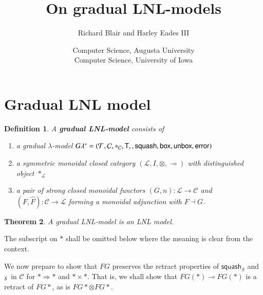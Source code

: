 \documentclass{article}
\date{}
\newtheorem{theorem}{Theorem}
\newtheorem{definition}[theorem]{Definition}
\let\mto\to
\let\to\relax
\newcommand{\to}{\rightarrow}
\let\split\relax
\newcommand{\cat}[1]{\mathcal{#1}}
\newcommand{\lolli}{\multimap}
\newcommand{\T}[0]{\mathsf{T}}
\newcommand{\split}[0]{\mathsf{split}}
\newcommand{\squash}[0]{\mathsf{squash}}
\newcommand{\bx}[0]{\mathsf{box}}
\newcommand{\error}[0]{\mathsf{error}}
\newcommand{\unbox}[0]{\mathsf{unbox}}
\begin{document}
\title{\vspace{-45px}On gradual LNL-models}
\author{Richard Blair and Harley Eades III}
\date{Computer Science, Augusta University\\Computer Science, University of Iowa}

\maketitle 

\section{Gradual LNL model}

\begin{definition} A \textbf{gradual LNL-model} consists of
  \begin{enumerate}
  \item a gradual $\lambda$-model $G\lambda^\ast = (\cat{T}, \cat{C}, \ast_{\cat{C}}, \T, \split, \squash, \bx, \unbox, \error)$
  \item a symmetric monoidal closed category $(\cat{L}, I, \otimes, \lolli)$ with distinguished object $\ast_{\cat{L}}$
  \item a pair of strong closed monoidal functors $(G, n) : \cat{L} \mto \cat{C}$ and $(F, \hat{F}) : \cat{C} \mto \cat{L}$ forming a monoidal adjunction with $F \dashv G$.
  \end{enumerate}
  
\end{definition}

\begin{theorem}
  A gradual LNL-model is an LNL model.
\end{theorem}
   
The subscript on $\ast$ shall be omitted below where the meaning is clear from the context.

We now prepare to show that $FG$ preserves the retract properties of $\squash_S$ and $\split_S$ in $\cat{C}$ for $\ast \Rightarrow \ast$ and $\ast \times \ast$. That is, we shall show that $FG(\ast) \lolli FG(\ast)$ is a retract of $FG\ast$, as is $FG\ast \otimes FG\ast$.
\end{document}
